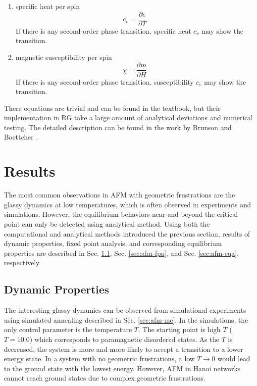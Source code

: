\begin{enumerate}
\item specific heat per spin
\begin{equation}
c_v = \frac{\partial e} {\partial T}
\end{equation}
If there is any second-order phase transition, specific heat $c_v$ may show the transition.

\item magnetic susceptibility per spin
\begin{equation}
\chi = \frac{\partial m} {\partial H}
\end{equation}
If there is any second-order phase transition, susceptibility  $c_v$ may show the transition.

\end{enumerate}

There equations are trivial and can be found in the textbook, but their implementation in RG take a large amount of analytical deviations and numerical testing. The detailed description can be found in the work by Brunson and Boettcher \cite{brunson2014rg}.


\section{Results}
\label{sec:afm-results}
The most common observations in AFM with geometric frustrations are the glassy dynamics at low temperatures, which is often observed in experiments and simulations. However, the equilibrium behaviors near and beyond the critical point can only be detected using analytical method. Using both the computational and analytical methods introduced the previous section, results of dynamic properties, fixed point analysis, and corresponding equilibrium properties are described in Sec. \ref{sec:afm-dyn}, Sec. \ref{sec:afm-fpa}, and Sec. \ref{sec:afm-eqa}, respectively.

\subsection{Dynamic Properties}
\label{sec:afm-dyn}
The interesting glassy dynamics can be observed from simulational experiments using simulated annealing described in Sec. \ref{sec:afm-mc}. In the simulations, the only control parameter is the temperature $T$. The starting point is high $T$ ($T=10.0$) which corresponds to 
 paramagnetic disordered states. As the $T$ is decreased, the system is more and more likely to
 accept a transition to a lower energy state. In a system with no geometric frustrations, a low $T\rightarrow0$ would lead to the ground state with the lowest energy. However, AFM in Hanoi networks cannot reach ground states due to complex geometric frustrations. 

